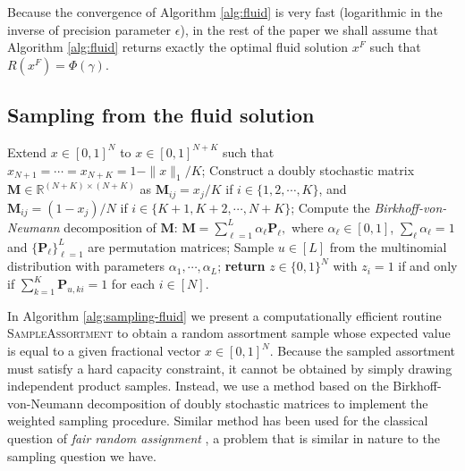 \documentclass[opre]{informs3aa}
\newcommand{\mat}{\mathbf }
\begin{document}
Because the convergence of Algorithm \ref{alg:fluid} is very fast (logarithmic in the inverse of precision parameter $\epsilon$), in the rest of the paper we shall assume that Algorithm \ref{alg:fluid}
returns exactly the optimal fluid solution $x^F$ such that $R(x^F)=\Phi(\gamma)$.

\subsection{Sampling from the fluid solution}

\begin{algorithm}[t]
\caption{Sampling from a fluid solution with hard capacity constraints}
\label{alg:sampling-fluid}
\begin{algorithmic}[1]
 
	\State Extend $x\in[0,1]^N$ to $x\in[0,1]^{N+K}$ such that $x_{N+1}=\cdots=x_{N+K}=1-\|x\|_1/K$; \label{line:extend}
	\State Construct a doubly stochastic matrix $\mat M\in\mathbb R^{(N+K)\times (N+K)}$ as $\mat M_{ij}=x_j/K$ if $i\in\{1,2,\cdots,K\}$, and 
	$\mat M_{ij}=(1-x_j)/N$ if $i\in\{K+1,K+2,\cdots,N+K\}$;
	\State Compute the \emph{Birkhoff-von-Neumann} decomposition of $\mat M$:
	$
	\mat M=\sum_{\ell=1}^L\alpha_\ell \mat P_\ell,
	$
	where $\alpha_\ell\in[0,1]$, $\sum_\ell\alpha_\ell=1$ and $\{\mat P_\ell\}_{\ell=1}^L$ are permutation matrices;
	\State Sample $u\in[L]$ from the multinomial distribution with parameters $\alpha_1,\cdots,\alpha_L$;
	\State \textbf{return} $z\in\{0,1\}^N$ with $z_i=1$ if and only if $\sum_{k=1}^K\mat P_{u, ki} =1 $ for each $i \in [N]$. \label{line:return}
\EndFunction
\end{algorithmic}
\end{algorithm}

In Algorithm \ref{alg:sampling-fluid} we present a computationally efficient routine \textsc{SampleAssortment} to obtain a random assortment sample
whose expected value is equal to a given fractional vector $x\in[0,1]^N$.
Because the sampled assortment must satisfy a hard capacity constraint, it cannot be obtained by simply drawing independent product samples.
Instead, we use a method based on the Birkhoff-von-Neumann decomposition of doubly stochastic matrices to implement the weighted sampling procedure.
Similar method has been used for the classical question of \emph{fair random assignment} \citep{budish2013designing}, a problem
that is similar in nature to the sampling question we have.
\end{document}
